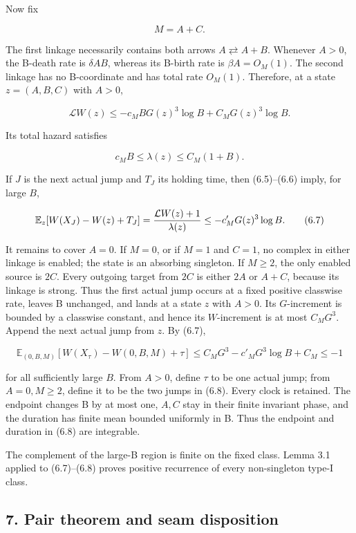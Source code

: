 Now fix

\[
                          M=A+C.                     \tag{6.4}
\]

The first linkage necessarily contains both arrows
\(A\rightleftarrows A+B\). Whenever \(A>0\), the B-death rate is
\(\delta AB\), whereas its B-birth rate is \(\beta A=O_M(1)\). The
second linkage has no B-coordinate and has total rate \(O_M(1)\).
Therefore, at a state \(z=(A,B,C)\) with \(A>0\),

\[
 \mathcal LW(z)
       \le-c_M B G(z)^3\log B+C_MG(z)^3\log B.      \tag{6.5}
\]

Its total hazard satisfies

\[
                   c_M B\le\lambda(z)\le C_M(1+B).  \tag{6.6}
\]

If \(J\) is the next actual jump and \(T_J\) its holding time, then
(6.5)--(6.6) imply, for large \(B\),

\[
 \mathbb E_z[W(X_J)-W(z)+T_J]
       ={\mathcal LW(z)+1\over\lambda(z)}
       \le-c'_MG(z)^3\log B.                         \tag{6.7}
\]

It remains to cover \(A=0\). If \(M=0\), or if \(M=1\) and \(C=1\), no
complex in either linkage is enabled; the state is an absorbing
singleton. If \(M\ge2\), the only enabled source is \(2C\). Every
outgoing target from \(2C\) is either \(2A\) or \(A+C\), because its
linkage is strong. Thus the first actual jump occurs at a fixed positive
classwise rate, leaves B unchanged, and lands at a state \(z\) with
\(A>0\). Its \(G\)-increment is bounded by a classwise constant, and
hence its \(W\)-increment is at most \(C_MG^3\). Append the next actual
jump from \(z\). By (6.7),

\[
 \mathbb E_{(0,B,M)}
 [W(X_\tau)-W(0,B,M)+\tau]
 \le C_MG^3-c'_MG^3\log B+C_M\le-1                 \tag{6.8}
\]

for all sufficiently large \(B\). From \(A>0\), define \(\tau\) to be
one actual jump; from \(A=0,M\ge2\), define it to be the two jumps in
(6.8). Every clock is retained. The endpoint changes B by at most one,
\(A,C\) stay in their finite invariant phase, and the duration has
finite mean bounded uniformly in B. Thus the endpoint and duration in
(6.8) are integrable.

The complement of the large-B region is finite on the fixed class. Lemma
3.1 applied to (6.7)--(6.8) proves positive recurrence of every
non-singleton type-I class.

\subsection{7. Pair theorem and seam
disposition}

